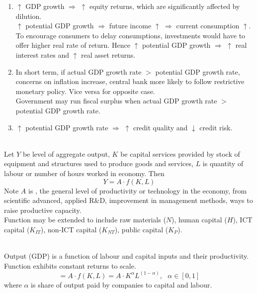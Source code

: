 \begin{remark} 
\begin{enumerate}[label=\roman*.]
\setlength{\itemsep}{0pt}
\item $\uparrow$ GDP growth $\Rightarrow$ $\uparrow$ equity returns, which are significantly affected by dilution.\\
$\uparrow$ potential GDP growth $\Rightarrow$ future income $\uparrow$ $\Rightarrow$ current consumption $\uparrow$.\\
To encourage consumers to delay consumptions, investments would have to offer higher real rate of return. Hence $\uparrow$ potential GDP growth $\Rightarrow$ $\uparrow$ real interest rates and $\uparrow$ real asset returns.
\item In short term, if actual GDP growth rate $>$ potential GDP growth rate, concerns on inflation increase, central bank more likely to follow restrictive monetary policy. Vice versa for opposite case. \\
Government may run fiscal surplus when actual GDP growth rate $>$ potential GDP growth rate.
\item $\uparrow$ potential GDP growth rate $\Rightarrow$ $\uparrow$ credit quality and $\downarrow$ credit risk.
\end{enumerate}
\end{remark}

\begin{definition} \\
Let $Y$ be level of aggregate output, $K$ be capital services provided by stock of equipment and structures used to produce goods and services, $L$ is quantity of labour or number of hours worked in economy. Then
\begin{equation}
Y = A \cdot f(K,L) \nonumber
\end{equation}
Note $A$ is , the general level of productivity or technology in the economy, from scientific advanced, applied R\&D, improvement in management methods, ways to raise productive capacity.\\
Function may be extended to include raw materials ($N$), human capital ($H$), ICT capital ($K_{IT}$), non-ICT capital ($K_{NT}$), public capital ($K_P$).
\end{definition}

\begin{definition} \\
Output (GDP) is a function of labour and capital inputs and their productivity.\\
Function exhibits constant returns to scale.
\begin{equation}
 = A \cdot f(K,L) = A \cdot K^{\alpha} L^{(1- \alpha)}, \ \ \ \alpha \in [0,1] \nonumber
\end{equation}
where $\alpha$ is share of output paid by companies to capital and labour.
\end{definition}

